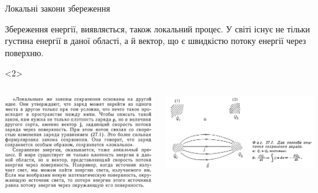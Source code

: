 \documentclass{beamer}
\begin{document}
\begin{frame}{Локальні закони збереження}{}
\begin{onlyenv}
\begin{block}{}
			Збереження енергії, виявляється, також локальний процес. У світі існує не тільки густина енергії в даної області, а й вектор, що є швидкістю потоку енергії через поверхню.
		\end{block}
	\end{onlyenv}
	\begin{onlyenv}
		\begin{columns}
			\begin{column}{0.5\linewidth}
				\begin{center}
					\includegraphics[width=\linewidth]{pictures/FML-local_Law}
				\end{center}
			\end{column}
			\begin{column}{0.5\linewidth}
				\begin{center}
					\includegraphics[width=\linewidth]{pictures/FML-local_Law-pic}
				\end{center}
			\end{column}
		\end{columns}
	\end{onlyenv}
\end{frame}
\end{document}
